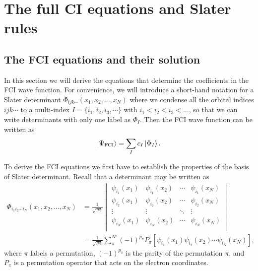 \documentclass[../Main/chem532-notes.tex]{subfiles}
\begin{document}
\chapter{The full CI equations and Slater rules}

\section{The FCI equations and their solution}

In this section we will derive the equations that determine the coefficients in the FCI wave function.
For convenience, we will introduce a short-hand notation for a Slater determinant $\Phi_{ijk\cdots}(x_1,x_2,\ldots,x_N)$ where we condense all the orbital indices ${ijk\cdots}$ to a multi-index $I = \{i_1,i_2,i_3,\cdots\}$ with $i_1 < i_2 < i_3 < \ldots$, so that we can write determinants with only one label as $\Phi_I$.
Then the FCI wave function can be written as
\begin{equation}
\ket{\Psi_{\mathrm{FCI}}} = \sum_I c_I \ket{\Phi_I}.
\end{equation}

To derive the FCI equations we first have to establish the properties of the basis of Slater determinant. Recall that a determinant may be written as
\begin{equation}
\begin{split}
\Phi_{i_1 i_2 \cdots i_N}(x_1,x_2,\ldots,x_N) &= \frac{1}{\sqrt{N!}}
\begin{vmatrix}
\psi_{i_1}(x_1) & \psi_{i_1}(x_2) & \cdots & \psi_{i_1}(x_N) \\
\psi_{i_2}(x_1) & \psi_{i_2}(x_2) & \cdots & \psi_{i_2}(x_N) \\
\vdots & \vdots & \ddots &  \vdots \\
\psi_{i_N}(x_1) & \psi_{i_N}(x_2) & \cdots & \psi_{i_N}(x_N) \\
\end{vmatrix} \\
&= \frac{1}{\sqrt{N!}}
\sum_{\pi}^{N!} (-1)^{p_\pi} P_{\pi}\left[
\psi_{i_1}(x_1) \psi_{i_2}(x_2) \cdots \psi_{i_N}(x_N)
\right],
\end{split}
\end{equation}
where $\pi$ labels a permutation, $(-1)^{p_\pi}$ is the parity of the permutation $\pi$, and $P_{\pi}$ is a permutation operator that acts on the electron coordinates.
\end{document}
